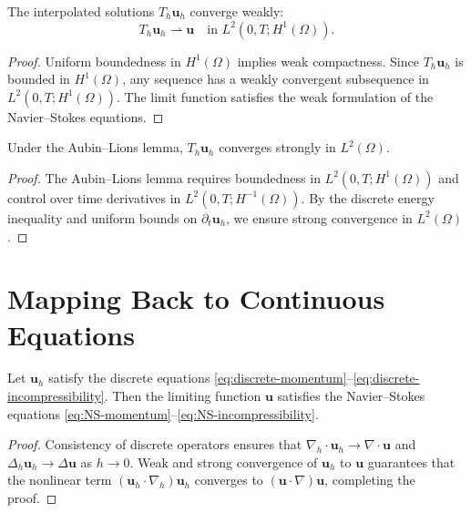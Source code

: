 \documentclass[12pt]{article}
\begin{document}
\begin{theorem}
The interpolated solutions $T_h \mathbf{u}_h$ converge weakly:
\begin{equation}
T_h \mathbf{u}_h \rightharpoonup \mathbf{u} \quad \text{in } L^2(0,T; H^1(\Omega)).
\end{equation}
\end{theorem}

\begin{proof}
Uniform boundedness in $H^1(\Omega)$ implies weak compactness. Since $T_h \mathbf{u}_h$ is bounded in $H^1(\Omega)$, any sequence has a weakly convergent subsequence in $L^2(0,T; H^1(\Omega))$. The limit function satisfies the weak formulation of the Navier--Stokes equations.
\end{proof}

\begin{theorem}
Under the Aubin--Lions lemma, $T_h \mathbf{u}_h$ converges strongly in $L^2(\Omega)$.
\end{theorem}

\begin{proof}
The Aubin--Lions lemma requires boundedness in $L^2(0,T; H^1(\Omega))$ and control over time derivatives in $L^2(0,T; H^{-1}(\Omega))$. By the discrete energy inequality and uniform bounds on $\partial_t \mathbf{u}_h$, we ensure strong convergence in $L^2(\Omega)$.
\end{proof}

\section{Mapping Back to Continuous Equations}

\begin{theorem}
Let $\mathbf{u}_h$ satisfy the discrete equations \eqref{eq:discrete-momentum}--\eqref{eq:discrete-incompressibility}. Then the limiting function $\mathbf{u}$ satisfies the Navier--Stokes equations \eqref{eq:NS-momentum}--\eqref{eq:NS-incompressibility}.
\end{theorem}

\begin{proof}
Consistency of discrete operators ensures that $\nabla_h \cdot \mathbf{u}_h \to \nabla \cdot \mathbf{u}$ and $\Delta_h \mathbf{u}_h \to \Delta \mathbf{u}$ as $h \to 0$. Weak and strong convergence of $\mathbf{u}_h$ to $\mathbf{u}$ guarantees that the nonlinear term $(\mathbf{u}_h \cdot \nabla_h) \mathbf{u}_h$ converges to $(\mathbf{u} \cdot \nabla) \mathbf{u}$, completing the proof.
\end{proof}
\end{document}
